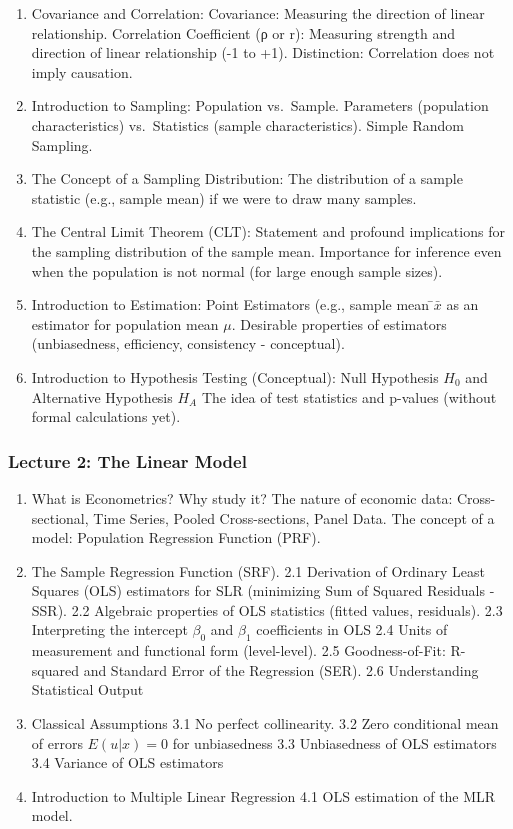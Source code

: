 \documentclass[
]{article}
\begin{document}
\begin{enumerate}
\def\labelenumi{\arabic{enumi}.}
\setcounter{enumi}{6}
\item
  Covariance and Correlation: Covariance: Measuring the direction of
  linear relationship. Correlation Coefficient (ρ or r): Measuring
  strength and direction of linear relationship (-1 to +1). Distinction:
  Correlation does not imply causation.
\item
  Introduction to Sampling: Population vs.~Sample. Parameters
  (population characteristics) vs.~Statistics (sample characteristics).
  Simple Random Sampling.
\item
  The Concept of a Sampling Distribution: The distribution of a sample
  statistic (e.g., sample mean) if we were to draw many samples.
\item
  The Central Limit Theorem (CLT): Statement and profound implications
  for the sampling distribution of the sample mean. Importance for
  inference even when the population is not normal (for large enough
  sample sizes).
\item
  Introduction to Estimation: Point Estimators (e.g., sample mean
  ̄\(\bar{x}\) as an estimator for population mean \(\mu\). Desirable
  properties of estimators (unbiasedness, efficiency, consistency -
  conceptual).
\item
  Introduction to Hypothesis Testing (Conceptual): Null Hypothesis
  \(H_0\) and Alternative Hypothesis \(H_A\) The idea of test statistics
  and p-values (without formal calculations yet).
\end{enumerate}

\subsubsection{Lecture 2: The Linear
Model}\label{lecture-2-the-linear-model}

\begin{enumerate}
\def\labelenumi{\arabic{enumi}.}
\item
  What is Econometrics? Why study it? The nature of economic data:
  Cross-sectional, Time Series, Pooled Cross-sections, Panel Data. The
  concept of a model: Population Regression Function (PRF).
\item
  The Sample Regression Function (SRF). 2.1 Derivation of Ordinary Least
  Squares (OLS) estimators for SLR (minimizing Sum of Squared Residuals
  - SSR). 2.2 Algebraic properties of OLS statistics (fitted values,
  residuals). 2.3 Interpreting the intercept \(\beta_0\) and \(\beta_1\)
  coefficients in OLS 2.4 Units of measurement and functional form
  (level-level). 2.5 Goodness-of-Fit: R-squared and Standard Error of
  the Regression (SER). 2.6 Understanding Statistical Output
\item
  Classical Assumptions 3.1 No perfect collinearity. 3.2 Zero
  conditional mean of errors \(E(u|x) = 0\) for unbiasedness 3.3
  Unbiasedness of OLS estimators 3.4 Variance of OLS estimators
\item
  Introduction to Multiple Linear Regression 4.1 OLS estimation of the
  MLR model.
\end{enumerate}
\end{document}

